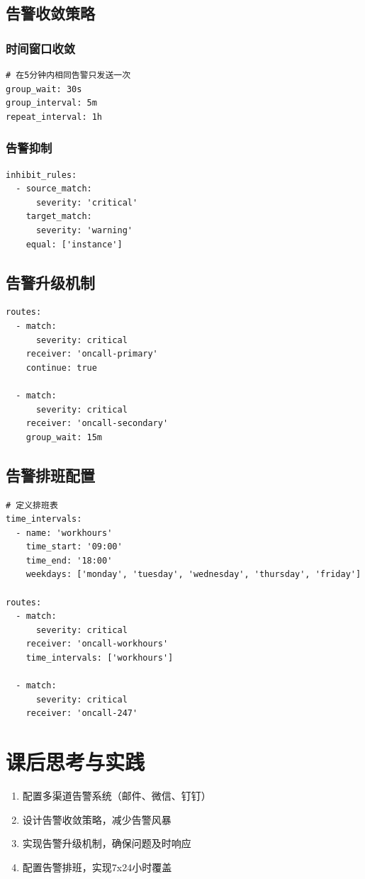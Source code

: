\documentclass[12pt,UTF8]{ctexbook}
\begin{document}
\subsection*{告警收敛策略}

\subsubsection{时间窗口收敛}
\begin{lstlisting}
# 在5分钟内相同告警只发送一次
group_wait: 30s
group_interval: 5m
repeat_interval: 1h
\end{lstlisting}

\subsubsection{告警抑制}
\begin{lstlisting}
inhibit_rules:
  - source_match:
      severity: 'critical'
    target_match:
      severity: 'warning'
    equal: ['instance']
\end{lstlisting}

\subsection*{告警升级机制}

\begin{lstlisting}
routes:
  - match:
      severity: critical
    receiver: 'oncall-primary'
    continue: true
  
  - match:
      severity: critical
    receiver: 'oncall-secondary'
    group_wait: 15m
\end{lstlisting}

\subsection*{告警排班配置}

\begin{lstlisting}
# 定义排班表
time_intervals:
  - name: 'workhours'
    time_start: '09:00'
    time_end: '18:00'
    weekdays: ['monday', 'tuesday', 'wednesday', 'thursday', 'friday']

routes:
  - match:
      severity: critical
    receiver: 'oncall-workhours'
    time_intervals: ['workhours']
  
  - match:
      severity: critical
    receiver: 'oncall-247'
\end{lstlisting}

\section{课后思考与实践}
\label{sec:alerting-practice}
\begin{enumerate}
    \item 配置多渠道告警系统（邮件、微信、钉钉）
    \item 设计告警收敛策略，减少告警风暴
    \item 实现告警升级机制，确保问题及时响应
    \item 配置告警排班，实现7x24小时覆盖
\end{enumerate}
\end{document}
